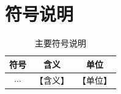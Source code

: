 \section{符号说明}

\begin{table}[H]
    \centering
    \caption{主要符号说明}
    \begin{tabular}{ccc}
        \toprule
        符号 & 含义 & 单位 \\
        \midrule
        $\cdots$ & 【含义】 & 【单位】 \\
        \bottomrule
    \end{tabular}
\end{table}
